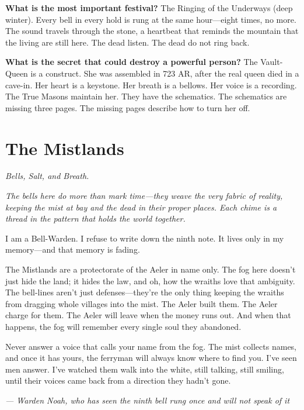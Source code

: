 \begin{almanac}
\textbf{What is the most important festival?} The Ringing of the Underways (deep winter). Every bell in every hold is rung at the same hour---eight times, no more. The sound travels through the stone, a heartbeat that reminds the mountain that the living are still here. The dead listen. The dead do not ring back.

\textbf{What is the secret that could destroy a powerful person?} The Vault-Queen is a construct. She was assembled in 723 AR, after the real queen died in a cave-in. Her heart is a keystone. Her breath is a bellows. Her voice is a recording. The True Masons maintain her. They have the schematics. The schematics are missing three pages. The missing pages describe how to turn her off.
\end{almanac}

\newpage

\newpage

\chapter{The Mistlands}
\emph{Bells, Salt, and Breath.}

\noindent
{\Large
\textit{The bells here do more than mark time---they weave the very fabric of reality, keeping the mist at bay and the dead in their proper places. Each chime is a thread in the pattern that holds the world together.}

\vspace{0.5em}

I am a Bell-Warden. I refuse to write down the ninth note. It lives only in my memory---and that memory is fading.

\vspace{0.5em}

The Mistlands are a protectorate of the Aeler in name only. The fog here doesn't just hide the land; it hides the law, and oh, how the wraiths love that ambiguity. The bell-lines aren't just defenses---they're the only thing keeping the wraiths from dragging whole villages into the mist. The Aeler built them. The Aeler charge for them. The Aeler will leave when the money runs out. And when that happens, the fog will remember every single soul they abandoned.

\vspace{0.5em}

Never answer a voice that calls your name from the fog. The mist collects names, and once it has yours, the ferryman will always know where to find you. I've seen men answer. I've watched them walk into the white, still talking, still smiling, until their voices came back from a direction they hadn't gone.

\vspace{1em}

\noindent\textit{--- Warden Noah, who has seen the ninth bell rung once and will not speak of it}
}


